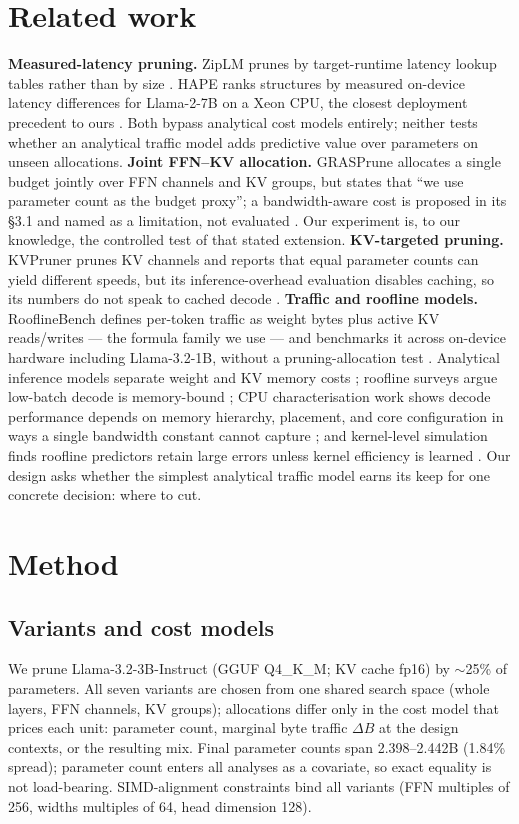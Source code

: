 \documentclass[11pt]{article}
\begin{document}
\section{Related work}
\textbf{Measured-latency pruning.} ZipLM prunes by target-runtime
latency lookup tables rather than by size \citep{ziplm2023}. HAPE
ranks structures by measured on-device latency differences for
Llama-2-7B on a Xeon CPU, the closest deployment precedent to ours
\citep{hape2025}. Both bypass analytical cost models entirely;
neither tests whether an analytical traffic model adds predictive
value over parameters on unseen allocations.
\textbf{Joint FFN--KV allocation.} GRASPrune allocates a single
budget jointly over FFN channels and KV groups, but states that
``we use parameter count as the budget proxy''; a bandwidth-aware
cost is proposed in its \S3.1 and named as a limitation, not
evaluated \citep{grasprune2026}. Our experiment is, to our
knowledge, the controlled test of that stated extension.
\textbf{KV-targeted pruning.} KVPruner prunes KV channels and
reports that equal parameter counts can yield different speeds,
but its inference-overhead evaluation disables caching, so its
numbers do not speak to cached decode \citep{kvpruner2024}.
\textbf{Traffic and roofline models.} RooflineBench defines
per-token traffic as weight bytes plus active KV reads/writes ---
the formula family we use --- and benchmarks it across on-device
hardware including Llama-3.2-1B, without a pruning-allocation test
\citep{rooflinebench2026}. Analytical inference models separate
weight and KV memory costs \citep{pope2023}; roofline surveys argue
low-batch decode is memory-bound \citep{yuan2024}; CPU
characterisation work shows decode performance depends on memory
hierarchy, placement, and core configuration in ways a single
bandwidth constant cannot capture \citep{iiswc2024}; and
kernel-level simulation finds roofline predictors retain large
errors unless kernel efficiency is learned \citep{kernelsight2026}.
Our design asks whether the simplest analytical traffic model
earns its keep for one concrete decision: where to cut.

\section{Method}
\subsection{Variants and cost models}
We prune Llama-3.2-3B-Instruct (GGUF Q4\_K\_M; KV cache fp16) by
$\sim$25\% of parameters. All seven variants are chosen from one
shared search space (whole layers, FFN channels, KV groups);
allocations differ only in the cost model that prices each unit:
parameter count, marginal byte traffic $\Delta B$ at the design
contexts, or the resulting mix. Final parameter counts span
2.398--2.442B (1.84\% spread); parameter count enters all analyses
as a covariate, so exact equality is not load-bearing.
SIMD-alignment constraints bind all variants (FFN multiples of
256, widths multiples of 64, head dimension 128).
\end{document}
